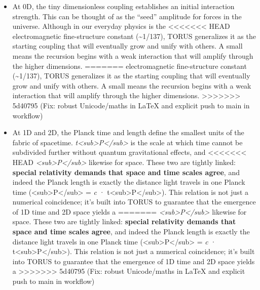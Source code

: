 \documentclass[]{article}
\begin{document}
{{\begin{itemize}
\item
  At 0D, the tiny dimensionless coupling \alpha establishes an initial
  interaction strength. This can be thought of as the ``seed'' amplitude
  for forces in the universe. Although \alpha in our everyday physics is the
<<<<<<< HEAD
  electromagnetic fine-structure constant (\textasciitilde1/137), TORUS
  generalizes it as the starting coupling that will eventually grow and
  unify with others. A small \alpha means the recursion begins with a weak
  interaction that will amplify through the higher dimensions.
=======
  electromagnetic fine-structure constant (\textasciitilde{}1/137),
  TORUS generalizes it as the starting coupling that will eventually
  grow and unify with others. A small \alpha means the recursion begins with
  a weak interaction that will amplify through the higher dimensions.
>>>>>>> 5d40795 (Fix: robust Unicode/maths in LaTeX and explicit push to main in workflow)
\item
  At 1D and 2D, the Planck time and length define the smallest units of
  the fabric of spacetime.
  \emph{t\textless{}sub\textgreater{}P\textless{}/sub\textgreater{}} is
  the scale at which time cannot be subdivided further without quantum
  gravitational effects, and
<<<<<<< HEAD
  \emph{\ell\textless sub\textgreater P\textless/sub\textgreater{}}
  likewise for space. These two are tightly linked: \textbf{special
  relativity demands that space and time scales agree}, and indeed the
  Planck length is exactly the distance light travels in one Planck time
  (\ell\textless sub\textgreater P\textless/sub\textgreater{} = \emph{c} ·
  t\textless sub\textgreater P\textless/sub\textgreater)\hspace{0pt}.
  This relation is not just a numerical coincidence; it's built into
  TORUS to guarantee that the emergence of 1D time and 2D space yields a
=======
  \emph{\ell\textless{}sub\textgreater{}P\textless{}/sub\textgreater{}}
  likewise for space. These two are tightly linked: \textbf{special
  relativity demands that space and time scales agree}, and indeed the
  Planck length is exactly the distance light travels in one Planck time
  (\ell\textless{}sub\textgreater{}P\textless{}/sub\textgreater{} =
  \emph{c} ·
  t\textless{}sub\textgreater{}P\textless{}/sub\textgreater{})​. This
  relation is not just a numerical coincidence; it's built into TORUS to
  guarantee that the emergence of 1D time and 2D space yields a
>>>>>>> 5d40795 (Fix: robust Unicode/maths in LaTeX and explicit push to main in workflow)

\end{itemize}}}
\end{document}
